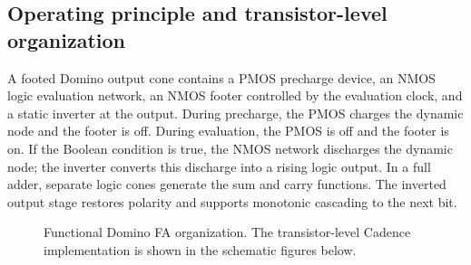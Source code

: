 \documentclass[11pt,a4paper]{article}
\begin{document}
\subsection{Operating principle and transistor-level organization}
A footed Domino output cone contains a PMOS precharge device, an NMOS logic evaluation network, an NMOS footer controlled by the evaluation clock, and a static inverter at the output. During precharge, the PMOS charges the dynamic node and the footer is off. During evaluation, the PMOS is off and the footer is on. If the Boolean condition is true, the NMOS network discharges the dynamic node; the inverter converts this discharge into a rising logic output. In a full adder, separate logic cones generate the sum and carry functions. The inverted output stage restores polarity and supports monotonic cascading to the next bit.

\begin{figure}[htbp]
\centering
\small
{}
\caption{Functional Domino FA organization. The transistor-level Cadence implementation is shown in the schematic figures below.}
\end{figure}
\end{document}
